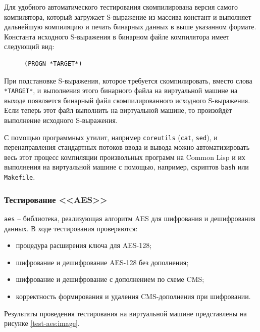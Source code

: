 Для удобного автоматического тестирования скомпилирована версия самого компилятора, который загружает S-выражение из массива констант и выполняет дальнейшую компиляцию и печать бинарных данных в выше указанном формате. Константа исходного S-выражения в бинарном файле компилятора имеет следующий вид:

\begin{figure}[H]
\begin{lstlisting}[language=Lisp]
(PROGN *TARGET*)
\end{lstlisting}
\end{figure}

При подстановке S-выражения, которое требуется скомпилировать, вместо слова \texttt{*TARGET*}, и выполнения этого бинарного файла на виртуальной машине на выходе появляется бинарный файл скомпилированного исходного S-выражения. Если теперь этот файл выполнить на виртуальной машине, то произойдёт выполнение исходного S-выражения.

С помощью программных утилит, например \texttt{coreutils} (\texttt{cat}, \texttt{sed}), и перенаправления стандартных потоков ввода и вывода можно автоматизировать весь этот процесс компиляции произвольных программ на Common Lisp и их выполнения на виртуальной машине с помощью, например, скриптов \texttt{bash} или \texttt{Makefile}.


\subsubsection{Тестирование <<AES>>}

\texttt{aes} -- библиотека, реализующая алгоритм AES для шифрования и дешифрования данных. В ходе тестирования проверяются:

\begin{itemize}
\item процедура расширения ключа для AES-128;
\item шифрование и дешифрование AES-128 без дополнения;
\item шифрование и дешифрование с дополнением по схеме CMS;
\item корректность формирования и удаления CMS-дополнения при шифровании.
\end{itemize}

Результаты проведения тестирования на виртуальной машине представлены на рисунке \ref{test-aes:image}.

